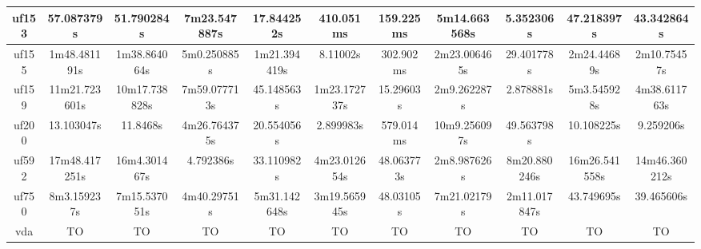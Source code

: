 \documentclass{article}
\begin{document}
\begin{table}[ht!]
\begin{tabular}{|c||c|c|c|c|c|c|c|c|c|c|}
uf153  & 57.087379s & 51.790284s & 7m23.547887s & 17.844252s & 410.051ms & 159.225ms & 5m14.663568s & 5.352306s & 47.218397s & 43.342864s \\\hline
uf155  & 1m48.481191s & 1m38.864064s & 5m0.250885s & 1m21.394419s & 8.11002s & 302.902ms & 2m23.006465s & 29.401778s & 2m24.44689s & 2m10.75457s \\\hline
uf159  & 11m21.723601s & 10m17.738828s & 7m59.077713s & 45.148563s & 1m23.172737s & 15.29603s & 2m9.262287s & 2.878881s & 5m3.545928s & 4m38.611763s \\\hline
uf200  & 13.103047s & 11.8468s & 4m26.764375s & 20.554056s & 2.899983s & 579.014ms & 10m9.256097s & 49.563798s & 10.108225s & 9.259206s \\\hline
uf592  & 17m48.417251s & 16m4.301467s & 4.792386s & 33.110982s & 4m23.012654s & 48.063773s & 2m8.987626s & 8m20.880246s & 16m26.541558s & 14m46.360212s \\\hline
uf750  & 8m3.159237s & 7m15.537051s & 4m40.29751s & 5m31.142648s & 3m19.565945s & 48.03105s & 7m21.02179s & 2m11.017847s & 43.749695s & 39.465606s \\\hline
vda & TO & TO & TO & TO & TO & TO & TO & TO & TO & TO \\\hline
\end{tabular}
\end{table}
\end{document}
